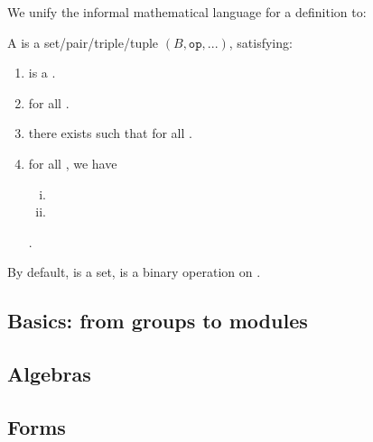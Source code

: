 \begin{remark}
\label{mk:Informal}

We unify the informal mathematical language for a definition to:

A  is a set/pair/triple/tuple $(B, \mathtt{op}, ...)$, satisfying:

\begin{enumerate}
    \item {} is a  .

    \item {} for all  .
    
    \item {}
    there exists  such that
     for all .

    \item {}for all , we have

        \begin{enumerate}[(i)]

        \item {}
        \item {}
        
        \end{enumerate}

        .

\end{enumerate}

By default,  is a set,  is a binary operation on .

\end{remark}

\subsection{Basics: from groups to modules}
\label{sec:basics}



\subsection{Algebras}
\label{sec:algebras}



\subsection{Forms}
\label{sec:forms}


